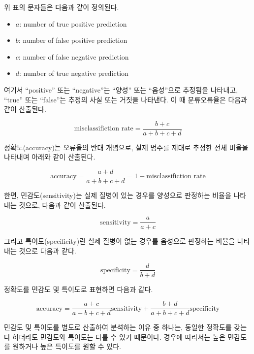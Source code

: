 \documentclass[
]{book}
\providecommand{\tightlist}{%
  \setlength{\itemsep}{0pt}\setlength{\parskip}{0pt}}
\begin{document}
위 표의 문자들은 다음과 같이 정의된다.

\begin{itemize}
\tightlist
\item
  \(a\): number of true positive prediction
\item
  \(b\): number of false positive prediction
\item
  \(c\): number of false negative prediction
\item
  \(d\): number of true negative prediction
\end{itemize}

여기서 ``positive'' 또는 ``negative''는 ``양성'' 또는 ``음성''으로 추정됨을 나타내고, ``true'' 또는 ``false''는 추정의 사실 또는 거짓을 나타낸다. 이 때 분류오류율은 다음과 같이 산출된다.

\begin{equation}
\text{misclassifiction rate} = \frac{b + c}{a + b + c + d}
\label{eq:cm-misclassification-rate}
\end{equation}

정확도(accuracy)는 오류율의 반대 개념으로, 실제 범주를 제대로 추정한 전체 비율을 나타내며 아래와 같이 산출된다.

\begin{equation}
\text{accuracy} = \frac{a + d}{a + b + c + d} = 1 - \text{misclassifiction rate}
\label{eq:cm-accuracy}
\end{equation}

한편, 민감도(sensitivity)는 실제 질병이 있는 경우를 양성으로 판정하는 비율을 나타내는 것으로, 다음과 같이 산출된다.

\begin{equation}
\text{sensitivity} = \frac{a}{a + c}
\label{eq:cm-sensitivity}
\end{equation}

그리고 특이도(specificity)란 실제 질병이 없는 경우를 음성으로 판정하는 비율을 나타내는 것으로 다음과 같다.

\begin{equation}
\text{specificity} = \frac{d}{b + d}
\label{eq:cm-specificity}
\end{equation}

정확도를 민감도 및 특이도로 표현하면 다음과 같다.

\begin{equation*}
\text{accuracy} = \frac{a + c}{a + b + c + d}\text{sensitivity} + \frac{b + d}{a + b + c + d}\text{specificity}
\end{equation*}

민감도 및 특이도를 별도로 산출하여 분석하는 이유 중 하나는, 동일한 정확도를 갖는다 하더라도 민감도와 특이도는 다를 수 있기 때문이다. 경우에 따라서는 높은 민감도를 원하거나 높은 특이도를 원할 수 있다.
\end{document}
